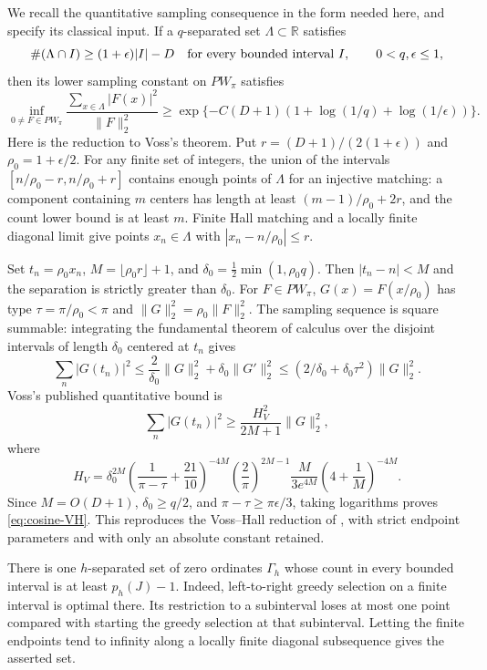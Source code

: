 We recall the quantitative sampling consequence in the form needed
here, and specify its classical input. If a \(q\)-separated set
\(\Lambda\subset\mathbb R\) satisfies
\[
 \#(\Lambda\cap I)\ge(1+\epsilon)|I|-D
       \quad\hbox{for every bounded interval }I,
 \qquad0<q,\epsilon\le1,
\]
then its lower sampling constant on \(PW_\pi\) satisfies
\begin{equation}\label{eq:cosine-VH}
 \inf_{0\ne F\in PW_\pi}
 \frac{\sum_{x\in\Lambda}|F(x)|^2}{\|F\|_2^2}
 \ge\exp\{-C(D+1)(1+\log(1/q)+\log(1/\epsilon))\}.
\end{equation}
Here is the reduction to Voss's theorem. Put
\(r=(D+1)/(2(1+\epsilon))\) and \(\rho_0=1+\epsilon/2\).
For any finite set of integers, the union of the intervals
\([n/\rho_0-r,n/\rho_0+r]\) contains enough points of
\(\Lambda\) for an injective matching: a component containing
\(m\) centers has length at least \((m-1)/\rho_0+2r\), and the
count lower bound is at least \(m\). Finite Hall matching and a
locally finite diagonal limit give points \(x_n\in\Lambda\)
with \(|x_n-n/\rho_0|\le r\).

Set \(t_n=\rho_0x_n\),
\(M=\lfloor\rho_0r\rfloor+1\), and
\(\delta_0=\tfrac12\min(1,\rho_0q)\).
Then \(|t_n-n|<M\) and the separation is strictly greater than
\(\delta_0\). For \(F\in PW_\pi\),
\(G(x)=F(x/\rho_0)\) has type \(\tau=\pi/\rho_0<\pi\)
and \(\|G\|_2^2=\rho_0\|F\|_2^2\).
The sampling sequence is square summable: integrating the fundamental
theorem of calculus over the disjoint intervals of length
\(\delta_0\) centered at \(t_n\) gives
\[
 \sum_n|G(t_n)|^2\le
 \frac{2}{\delta_0}\|G\|_2^2+\delta_0\|G'\|_2^2
 \le(2/\delta_0+\delta_0\tau^2)\|G\|_2^2.
\]
Voss's published quantitative bound
\cite[Theorem~2 and Corollary~1, pp.~195--196]{voss1999} is
\[
 \sum_n|G(t_n)|^2\ge\frac{H_V^2}{2M+1}\|G\|_2^2,
\]
where
\[
 H_V=\delta_0^{2M}
 \left(\frac1{\pi-\tau}+\frac{21}{10}\right)^{-4M}
 \left(\frac2\pi\right)^{2M-1}
 \frac{M}{3e^{4M}}\left(4+\frac1M\right)^{-4M}.
\]
Since \(M=O(D+1)\), \(\delta_0\ge q/2\), and
\(\pi-\tau\ge\pi\epsilon/3\), taking logarithms proves
\eqref{eq:cosine-VH}. This reproduces the Voss--Hall reduction of
\cite[Proposition~2.4, p.~8]{mori-sharp2026}, with strict endpoint
parameters and with only an absolute constant retained.

There is one \(h\)-separated set of zero ordinates \(\Gamma_h\)
whose count in every bounded interval is at least \(p_h(J)-1\).
Indeed, left-to-right greedy selection on a finite interval is
optimal there. Its restriction to a subinterval loses at most one
point compared with starting the greedy selection at that
subinterval. Letting the finite endpoints tend to infinity along a
locally finite diagonal subsequence gives the asserted set.

